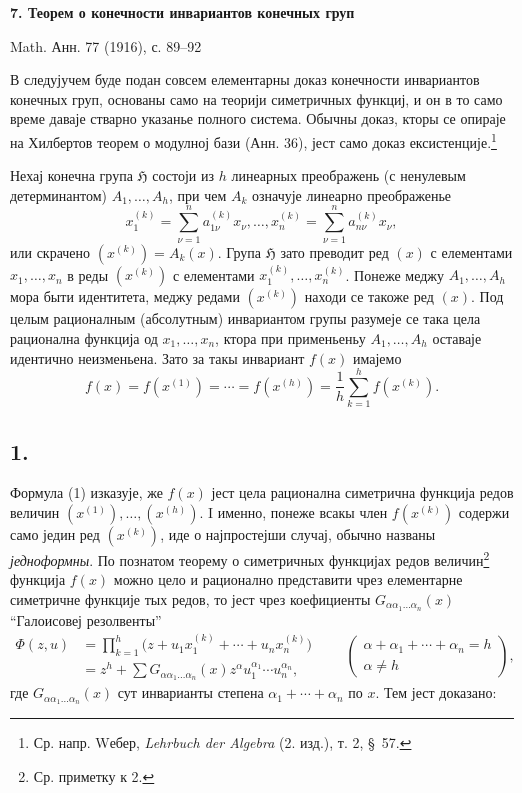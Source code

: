 ﻿\documentclass[11pt]{article}
\providecommand{\Hgrp}{\mathfrak{H}}
\begin{document}
\begin{center}
{\Large\bfseries 7. Теорем о конечности инвариантов конечных груп}\par
\vspace{1.2em}
Math. Анн. 77 (1916), с. 89--92
\end{center}

\vspace{1em}

В следујучем буде подан совсем елементарны доказ конечности инвариантов конечных груп, основаны само на теорији симетричных функциј, и он в то само време даваје стварно указанье полного система. Обычны доказ, кторы се опираје на Хилбертов теорем о модулној бази (Анн. 36), јест само доказ ексистенције.\footnote{Ср. напр. Wебер, \emph{Lehrbuch der Algebra} (2. изд.), т. 2, \S\ 57.}

Нехај конечна група $\Hgrp$ состоји из $h$ линеарных преображень (с ненулевым детерминантом) $A_1,\ldots,A_h$, при чем $A_k$ означује линеарно преображенье
\[
  x_1^{(k)}=\sum_{\nu=1}^{n}a_{1\nu}^{(k)}x_\nu,\ldots,
  x_n^{(k)}=\sum_{\nu=1}^{n}a_{n\nu}^{(k)}x_\nu,
\]
или скрачено $(x^{(k)})=A_k(x)$. Група $\Hgrp$ зато преводит ред $(x)$ с елементами $x_1,\ldots,x_n$ в реды $(x^{(k)})$ с елементами $x_1^{(k)},\ldots,x_n^{(k)}$. Понеже меджу $A_1,\ldots,A_h$ мора быти идентитета, меджу редами $(x^{(k)})$ находи се такоже ред $(x)$. Под целым рационалным (абсолутным) инвариантом групы разумеје се така цела рационална функција од $x_1,\ldots,x_n$, ктора при применьеньу $A_1,\ldots,A_h$ оставаје идентично неизменьена. Зато за такы инвариант $f(x)$ имајемо
\begin{equation}
  f(x)=f(x^{(1)})=\cdots=f(x^{(h)})=
  \frac1h\sum_{k=1}^{h}f(x^{(k)}).
\tag{1}
\end{equation}

\subsection*{1.}
Формула (1) изказује, же $f(x)$ јест цела рационална симетрична функција редов величин $(x^{(1)}),\ldots,(x^{(h)})$. I именно, понеже всакы член $f(x^{(k)})$ содержи само једин ред $(x^{(k)})$, иде о најпростејши случај, обычно названы {\itshape једноформны}. По познатом теорему о симетричных функцијах редов величин\footnote{Ср. приметку к 2.} функција $f(x)$ можно цело и рационално представити чрез елементарне симетричне функције тых редов, то јест чрез коефициенты $G_{\alpha\alpha_1\ldots\alpha_n}(x)$ ``Галоисовеј резолвенты''
\[
\begin{aligned}
  \Phi(z,u)
  &=\prod_{k=1}^{h}\bigl(z+u_1x_1^{(k)}+\cdots+u_nx_n^{(k)}\bigr) \\
  &=z^h+
    \sum G_{\alpha\alpha_1\ldots\alpha_n}(x)
    z^{\alpha}u_1^{\alpha_1}\cdots u_n^{\alpha_n},
\end{aligned}
\qquad
\left(\begin{array}{c}
\alpha+\alpha_1+\cdots+\alpha_n=h\\
\alpha\ne h
\end{array}\right),
\]
где $G_{\alpha\alpha_1\ldots\alpha_n}(x)$ сут инварианты степена $\alpha_1+\cdots+\alpha_n$ по $x$. Тем јест доказано:
\end{document}
